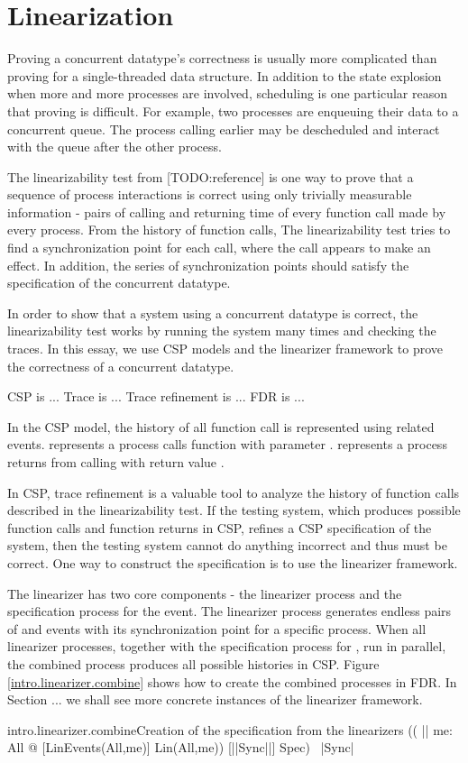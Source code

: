 \documentclass{article}
\begin{document}
\section{Linearization}
Proving a concurrent datatype's correctness is usually more complicated than proving for a single-threaded data structure. In addition to the state explosion when more and more processes are involved, scheduling is one particular reason that proving is difficult. For example, two processes are enqueuing their data to a concurrent queue. The process calling earlier may be descheduled and interact with the queue after the other process.

The linearizability test from [TODO:reference] is one way to prove that a sequence of process interactions is correct using only trivially measurable information - pairs of calling and returning time of every function call made by every process.   From the history of function calls, The linearizability test tries to find a synchronization point for each call, where the call appears to make an effect. In addition, the series of synchronization points should satisfy the specification of the concurrent datatype.

In order to show that a system using a concurrent datatype is correct, the linearizability test works by running the system many times and checking the traces. In this essay, we use CSP models and the linearizer framework to prove the correctness of a concurrent datatype.

CSP is ... Trace is ... Trace refinement is ... FDR is ...

In the CSP model, the history of all function call is represented using related events.  represents a process calls function  with parameter .  represents a process returns from calling  with return value .

In CSP, trace refinement is a valuable tool to analyze the history of function calls described in the linearizability test. If the testing system, which produces possible function calls and function returns in CSP, refines a CSP specification of the system, then the testing system cannot do anything incorrect and thus must be correct. One way to construct the specification is to use the linearizer framework.

The linearizer has two core components - the linearizer process and the specification process for the  event. The linearizer process generates endless pairs of  and  events with its synchronization point for a specific process. When all linearizer processes, together with the specification process for , run in parallel, the combined process produces all possible histories in CSP. Figure \ref{intro.linearizer.combine} shows how to create the combined processes in FDR. In Section ... we shall see more concrete instances of the linearizer framework.
\begin{cspinline}{intro.linearizer.combine}{Creation of the specification from the linearizers}
(( || me: All @ [LinEvents(All,me)]  Lin(All,me)) [|{|Sync|}|] Spec) \ {|Sync|}
\end{cspinline}
\end{document}
